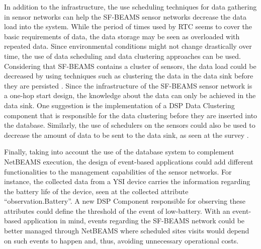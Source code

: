 In addition to the infrastructure, the use  scheduling techniques for
data gathering in sensor networks can help the SF-BEAMS sensor networks
decrease the data load into the system. While the period of times used by RTC
seems to cover the basic requirements of data, the data storage may be seen as
overloaded with repeated data. Since environmental conditions might not change
drastically over time, the use of data scheduling and data clustering
approaches can be used. Considering that SF-BEAMS contains a cluster of
sensors, the data load could be decreased by using techniques such as
clustering the data in the data sink before they are persisted
\cite{sn-time-series, sn-schedule-minimal-aggregation-time}. Since the
infrastructure of the SF-BEAMS sensor network is a one-hop start design, the
knowledge about the data can only be achieved in the data sink. One suggestion
is the implementation of a DSP Data Clustering component that is responsible
for the data clustering before they are inserted into the database. Similarly,
the use of schedulers on the sensors could also be used to decrease the amount
of data to be sent to the data sink, as seen at the survey
\cite{sn-scheduling-survey}.

Finally, taking into account the use of the database system to complement
NetBEAMS execution, the design of event-based applications could add different
functionalities to the management capabilities of the sensor networks. For
instance, the collected data from a YSI device \cite{YSI-Sonde} carries the
information regarding the battery life of the device, seen at the collected
attribute ``observation.Battery''. A new DSP Component responsible for
observing these attributes could define the threshold of the event of
low-battery. With an event-based application in mind, events regarding the
SF-BEAMS network could be better managed through NetBEAMS where scheduled
sites visits would depend on such events to happen and, thus, avoiding
unnecessary operational costs.
